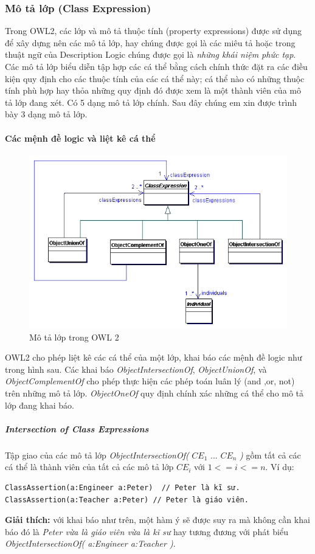 \subsubsection{Mô tả lớp (Class Expression)}
Trong OWL2, các lớp và mô tả thuộc tính (property expressions) được sử dụng để xây dựng nên các mô tả lớp, hay chúng được gọi là các miêu tả hoặc trong thuật ngữ của Description Logic chúng được gọi là \textit{những khái niệm phức tạp}. Các mô tả lớp 
biểu diễn tập hợp các cá thể bằng cách chính thức đặt ra các điều kiện quy định cho các thuộc tính của các cá thể này; cá thể nào có những thuộc tính phù hợp hay thỏa những quy định đó được xem là một thành viên của mô tả lớp đang xét. Có 5 dạng mô tả lớp chính. Sau đây chúng em xin được trình bày 3 dạng mô tả lớp.
\paragraph{Các mệnh đề logic và liệt kê cá thể}
\begin{figure}[h]
	\centering
	\includegraphics[width=150mm]{Figures/ce_0.png}
	\caption{Mô tả lớp trong OWL 2\label{overflow}}
\end{figure}
OWL2 cho phép liệt kê các cá thể của một lớp, khai báo các mệnh đề logic như trong hình sau. Các khai báo \textit{ObjectIntersectionOf}, \textit{ObjectUnionOf}, và \textit{ObjectComplementOf} cho phép thực hiện các phép toán luân lý (and ,or, not) trên những mô tả lớp. \textit{ObjectOneOf} quy định chính xác những cá thể cho mô tả lớp đang khai báo.

\subparagraph{Intersection of Class Expressions} Tập giao của các mô tả lớp \textit{ObjectIntersectionOf(} $CE_{1}$ ... $CE_{n}$ \textit{)} gồm tất cả các cá thể là thành viên của tất cả các mô tả lớp $CE_{i}$ với $1<=i<=n$. Ví dụ: 
\begin{verbatim}
ClassAssertion(a:Engineer a:Peter)  // Peter là kĩ sư.
ClassAssertion(a:Teacher a:Peter) // Peter là giáo viên.
\end{verbatim}
\textbf{Giải thích: } với khai báo như trên, một hàm ý sẽ được suy ra mà không cần khai báo đó là \textit{Peter vừa là giáo viên vừa là kĩ sư} hay tương đương với phát biểu \textit{ObjectIntersectionOf( a:Engineer a:Teacher )}. 


